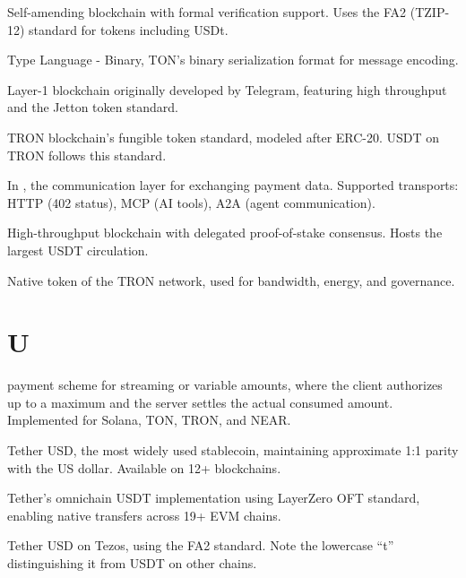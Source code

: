 \begin{description}[style=nextline]

\item[Tezos]
Self-amending blockchain with formal verification support. Uses the FA2 (TZIP-12) standard for tokens including USDt.

\item[TL-B]
Type Language - Binary, TON's binary serialization format for message encoding.

\item[TON (The Open Network)]
Layer-1 blockchain originally developed by Telegram, featuring high throughput and the Jetton token standard.

\item[TRC-20]
TRON blockchain's fungible token standard, modeled after ERC-20. USDT on TRON follows this standard.

\item[Transport]
In \tprotocol{}, the communication layer for exchanging payment data. Supported transports: HTTP (402 status), MCP (AI tools), A2A (agent communication).

\item[TRON]
High-throughput blockchain with delegated proof-of-stake consensus. Hosts the largest USDT circulation.

\item[TRX]
Native token of the TRON network, used for bandwidth, energy, and governance.

\end{description}

\section*{U}

\begin{description}[style=nextline]

\item[Up-To Scheme]
\tprotocol{} payment scheme for streaming or variable amounts, where the client authorizes up to a maximum and the server settles the actual consumed amount. Implemented for Solana, TON, TRON, and NEAR.

\item[USDT]
Tether USD, the most widely used stablecoin, maintaining approximate 1:1 parity with the US dollar. Available on 12+ blockchains.

\item[USDT0]
Tether's omnichain USDT implementation using LayerZero OFT standard, enabling native transfers across 19+ EVM chains.

\item[USDt]
Tether USD on Tezos, using the FA2 standard. Note the lowercase ``t'' distinguishing it from USDT on other chains.

\end{description}

